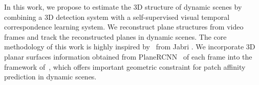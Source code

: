 In this work, we propose to estimate the 3D structure of dynamic scenes by combining a 3D detection system with a self-supervised visual temporal correspondence learning system.
We reconstruct plane structures from video frames and track the reconstructed planes in dynamic scenes. 
The core methodology of this work is highly inspired by~\cite{jabri2020walk} from Jabri \etal. We incorporate 3D planar surfaces information obtained from PlaneRCNN~\cite{liu2019planercnn} of each frame into the framework of~\cite{jabri2020walk}, which offers important geometric constraint for patch affinity prediction in dynamic scenes. 


